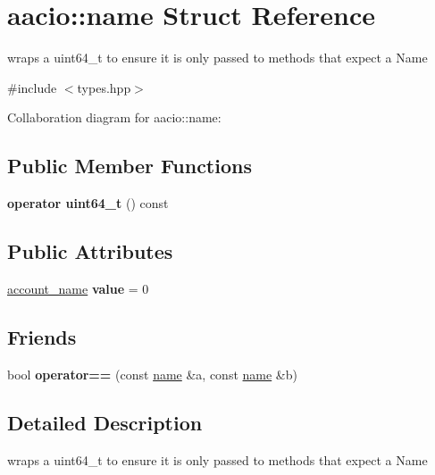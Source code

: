 \hypertarget{structaacio_1_1name}{}\section{aacio\+:\+:name Struct Reference}
\label{structaacio_1_1name}


wraps a uint64\+\_\+t to ensure it is only passed to methods that expect a Name  




{\ttfamily \#include $<$types.\+hpp$>$}



Collaboration diagram for aacio\+:\+:name\+:
\subsection*{Public Member Functions}
\begin{DoxyCompactItemize}
\item 
\mbox{\label{structaacio_1_1name_abfb27503ffa5a82d862914b9364b221b}} 
{\bfseries operator uint64\+\_\+t} () const
\end{DoxyCompactItemize}
\subsection*{Public Attributes}
\begin{DoxyCompactItemize}
\item 
\mbox{\label{structaacio_1_1name_aca264dddaaed7631acc506e89804287c}} 
\mbox{\hyperlink{structaacio_1_1chain_1_1name}{account\+\_\+name}} {\bfseries value} = 0
\end{DoxyCompactItemize}
\subsection*{Friends}
\begin{DoxyCompactItemize}
\item 
\mbox{\label{structaacio_1_1name_ab35bfaf393e498e39ffe3e280c4c90bf}} 
bool {\bfseries operator==} (const \mbox{\hyperlink{structaacio_1_1name}{name}} \&a, const \mbox{\hyperlink{structaacio_1_1name}{name}} \&b)
\end{DoxyCompactItemize}


\subsection{Detailed Description}
wraps a uint64\+\_\+t to ensure it is only passed to methods that expect a Name 


